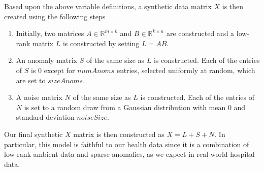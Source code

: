 \documentclass[conference]{IEEEtran}
\begin{document}
Based upon the above variable definitions, a synthetic data matrix $X$ is then created using the following steps
\begin{enumerate}
\item Initially, two matrices $A \in \mathbb{R}^{m \times k}$ and $B \in \mathbb{R}^{k \times n}$ are constructed and a low-rank matrix $L$ is constructed by setting $L = AB$.
\item An anomaly matrix $S$ of the same size as $L$ is constructed.  Each of the entries of $S$ is $0$ except for $numAnoms$ entries, selected uniformly at random, which are set to $sizeAnoms$.
\item A noise matrix $N$ of the same size as $L$ is constructed. Each of the entries of $N$ is set to a random draw from a Gaussian distribution with mean $0$ and standard deviation $noiseSize$.
\end{enumerate}
\noindent Our final synthetic $X$ matrix is then constructed as $X=L+S+N$.  In particular, this model is faithful to our health data since it is a combination of low-rank ambient data and sparse anomalies, as we expect in real-world hospital data.
\end{document}
